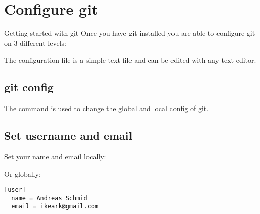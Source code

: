 \section{Configure git}
\begin{frame}[fragile]
  \slidetitle
  \begin{block}{Getting started with git}
    Once you have git installed you are able to configure git on 3 different levels:
    \begin{itemize}
    \end{itemize}

    The configuration file is a simple text file and can be edited with any text editor.
  \end{block}
\end{frame}

\subsection{git config}
\begin{frame}[fragile]
  \subslidetitle
  The command  is used to change the global and local config of git.
\end{frame}

\subsection{Set username and email}
\begin{frame}[fragile]
  \subslidetitle
  \vspace{1em}
  Set your name and email locally:
  \begin{itemize}
  \end{itemize}
  \vspace{1em}
  Or globally:
  \begin{itemize}
  \end{itemize}

\begin{lstlisting}
[user]
  name = Andreas Schmid
  email = ikeark@gmail.com
\end{lstlisting}
\end{frame}

